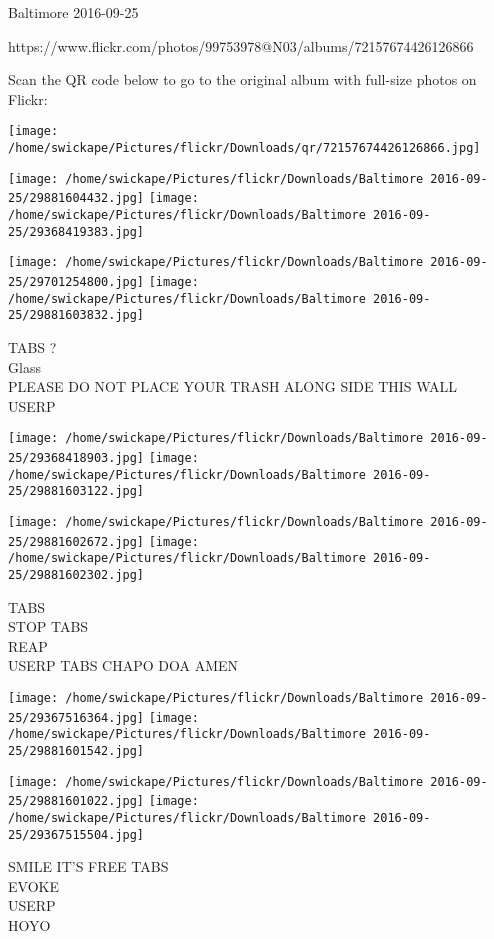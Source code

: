 \documentclass[10pt,letterpaper]{article}
\begin{document}
Baltimore 2016-09-25

https://www.flickr.com/photos/99753978@N03/albums/72157674426126866

Scan the QR code below to go to the original album with full-size photos on Flickr:

\texttt{[image: /home/swickape/Pictures/flickr/Downloads/qr/72157674426126866.jpg]}
\pagebreak

\texttt{[image: /home/swickape/Pictures/flickr/Downloads/Baltimore 2016-09-25/29881604432.jpg]}
\texttt{[image: /home/swickape/Pictures/flickr/Downloads/Baltimore 2016-09-25/29368419383.jpg]}

\texttt{[image: /home/swickape/Pictures/flickr/Downloads/Baltimore 2016-09-25/29701254800.jpg]}
\texttt{[image: /home/swickape/Pictures/flickr/Downloads/Baltimore 2016-09-25/29881603832.jpg]}

TABS ?\\
Glass\\
PLEASE DO NOT PLACE YOUR TRASH ALONG SIDE THIS WALL\\
USERP
\pagebreak

\texttt{[image: /home/swickape/Pictures/flickr/Downloads/Baltimore 2016-09-25/29368418903.jpg]}
\texttt{[image: /home/swickape/Pictures/flickr/Downloads/Baltimore 2016-09-25/29881603122.jpg]}

\texttt{[image: /home/swickape/Pictures/flickr/Downloads/Baltimore 2016-09-25/29881602672.jpg]}
\texttt{[image: /home/swickape/Pictures/flickr/Downloads/Baltimore 2016-09-25/29881602302.jpg]}

TABS\\
STOP TABS\\
REAP\\
USERP TABS CHAPO DOA AMEN
\pagebreak

\texttt{[image: /home/swickape/Pictures/flickr/Downloads/Baltimore 2016-09-25/29367516364.jpg]}
\texttt{[image: /home/swickape/Pictures/flickr/Downloads/Baltimore 2016-09-25/29881601542.jpg]}

\texttt{[image: /home/swickape/Pictures/flickr/Downloads/Baltimore 2016-09-25/29881601022.jpg]}
\texttt{[image: /home/swickape/Pictures/flickr/Downloads/Baltimore 2016-09-25/29367515504.jpg]}

SMILE IT'S FREE TABS\\
EVOKE\\
USERP\\
HOYO
\pagebreak
\end{document}
